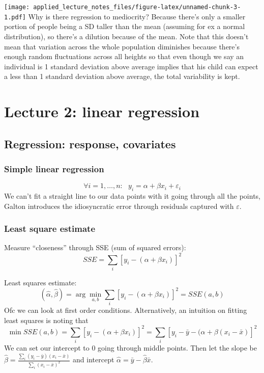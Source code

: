 \documentclass[
]{article}
\begin{document}
\texttt{[image: applied\_lecture\_notes\_files/figure-latex/unnamed-chunk-3-1.pdf]}
Why is there regression to mediocrity? Because there's only a smaller
portion of people being a SD taller than the mean (assuming for ex a
normal distribution), so there's a dilution because of the mean. Note
that this doesn't mean that variation across the whole population
diminishes because there's enough random fluctuations across all heights
so that even though we say an individual is 1 standard deviation above
average implies that his child can expect a less than 1 standard
deviation above average, the total variability is kept.

\hypertarget{lecture-2-linear-regression}{%
\section{Lecture 2: linear
regression}\label{lecture-2-linear-regression}}

\hypertarget{regression-response-covariates}{%
\subsection{Regression: response,
covariates}\label{regression-response-covariates}}

\hypertarget{simple-linear-regression}{%
\subsubsection{Simple linear
regression}\label{simple-linear-regression}}

\[\forall i=1,\dots, n:\ \ \ y_i=\alpha+\beta x_i+\varepsilon_i\] We
can't fit a straight line to our data points with it going through all
the points, Galton introduces the idiosyncratic error through residuals
captured with \(\varepsilon\).

\hypertarget{least-square-estimate}{%
\subsubsection{Least square estimate}\label{least-square-estimate}}

Measure ``closeness'' through SSE (sum of squared errors):
\[SSE=\sum_i [y_i-(\alpha+\beta x_i)]^2\]

Least squares estimate:
\[(\hat{\alpha},\hat{\beta})=\arg\min_{a, b}\sum_i [y_i-(\alpha+\beta x_i)]^2=SSE(a,b)\]
Ofc we can look at first order conditions. Alternatively, an intuition
on fitting least squares is noting that
\[\min SSE(a,b)=\sum_i [y_i-(\alpha+\beta x_i)]^2=\sum_i [y_i-\bar{y}-(\alpha+\beta (x_i-\bar{x})]^2\]
We can set our intercept to 0 going through middle points. Then let the
slope be
\(\hat{\beta}=\frac{\sum_i (y_i-\bar{y})(x_i-\bar{x})}{\sum_i (x_i-\bar{x})^2}\)
and intercept \(\hat{\alpha}=\bar{y}-\hat{\beta}\bar{x}\).
\end{document}
